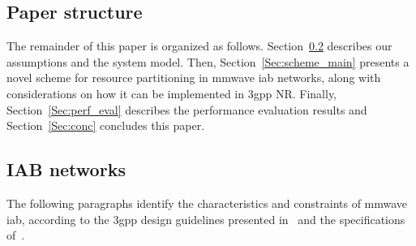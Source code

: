 


\subsection{Paper structure}
The remainder of this paper is organized as follows. Section~\ref{Sec:Sys-model} describes our assumptions and the system model. Then, Section~\ref{Sec:scheme_main} presents a novel scheme for resource partitioning in \gls{mmwave} \gls{iab} networks, along with considerations on how it can be implemented in \gls{3gpp} NR. Finally, Section~\ref{Sec:perf_eval} describes the performance evaluation results and Section~\ref{Sec:conc} concludes this paper.

\subsection{IAB networks}
\label{Sec:Sys-model}

The following paragraphs identify the characteristics and constraints of \gls{mmwave} \gls{iab}, according to the \gls{3gpp} design guidelines presented in~\cite{3gpp_38_874} and the specifications of~\cite{3gpp_38_174}.

